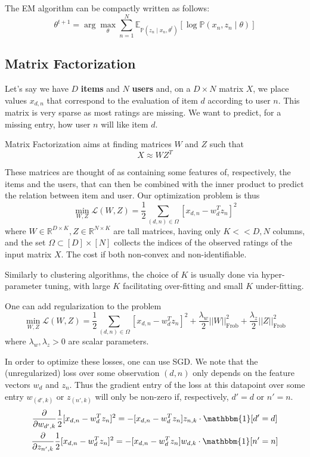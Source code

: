 \documentclass{article}
\newcommand{\R}{\mathbb{R}}
\newcommand{\prob}{\mathbb{P}}
\newcommand{\E}{\mathbb{E}}
\newcommand{\ind}{\mathbbm{1}}
\newcommand{\loss}{\mathcal{L}}
\begin{document}
The EM algorithm can be compactly written as follows:
$$
\theta^{t+1} = \arg \max_\theta \sum_{n=1}^N \E_{\prob(z_n \mid x_n, \theta^t)} \left[ \log \prob(x_n, z_n \mid \theta) \right]
$$

\subsection{Matrix Factorization}

Let's say we have $D$ \textbf{items} and $N$ \textbf{users} and, on a $D \times N$ matrix $X$, we place values $x_{d,n}$ that correspond to the evaluation of item $d$ according to user $n$.
This matrix is very sparse as most ratings are missing.
We want to predict, for a missing entry, how user $n$ will like item $d$.

Matrix Factorization aims at finding matrices $W$ and $Z$ such that
$$
X \approx WZ^T
$$

These matrices are thought of as containing some features of, respectively, the items and the users, that can then be combined with the inner product to predict the relation between item and user.
Our optimization problem is thus
$$
\min_{W, Z} \loss(W, Z) = \frac{1}{2} \sum_{(d,n) \in \Omega} [ x_{d,n} - w_d^T z_n]^2
$$
where $W \in \R^{D \times K}, Z \in \R^{N \times K}$ are tall matrices, having only $K << D, N$ columns, and the set $\Omega \subset [D] \times [N]$ collects the indices of the observed ratings of the input matrix $X$.
The cost if both non-convex and non-identifiable.

Similarly to clustering algorithms, the choice of $K$ is usually done via hyper-parameter tuning, with large $K$ facilitating over-fitting and small $K$ under-fitting.

One can add regularization to the problem
$$
\min_{W, Z} \loss(W, Z) = 
\frac{1}{2} \sum_{(d,n) \in \Omega} [ x_{d,n} - w_d^T z_n]^2 +
    \frac{\lambda_w}{2} ||W||^2_\text{Frob} +
    \frac{\lambda_z}{2} ||Z||^2_\text{Frob}
$$
where $\lambda_w, \lambda_z > 0$ are scalar parameters.

In order to optimize these losses, one can use SGD.
We note that the (unregularized) loss over some observation $(d,n)$ only depends on the feature vectors $w_d$ and $z_n$.
Thus the gradient entry of the loss at this datapoint over some entry $w_{(d', k)}$ or $z_{(n', k)}$ will only be non-zero if, respectively, $d' = d$ or $n' = n$.
\begin{gather*}
\frac{\partial}{\partial w_{d', k}} \frac{1}{2} [x_{d,n} - w_d^T z_n]^2 =
-[x_{d,n} - w_d^T z_n] z_{n,k} \cdot \ind[d' = d] \\
\frac{\partial}{\partial z_{n', k}} \frac{1}{2} [x_{d,n} - w_d^T z_n]^2 =
-[x_{d,n} - w_d^T z_n] w_{d,k} \cdot \ind[n' = n]
\end{gather*}
\end{document}
